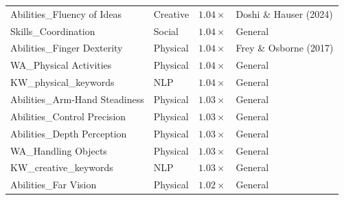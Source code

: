 \begin{table}[htbp]
\begin{tabular}{llcl}
Abilities\_Fluency of Ideas & Creative & $1.04\times$ & Doshi \& Hauser (2024) \\
Skills\_Coordination & Social & $1.04\times$ & General \\
Abilities\_Finger Dexterity & Physical & $1.04\times$ & Frey \& Osborne (2017) \\
WA\_Physical Activities & Physical & $1.04\times$ & General \\
KW\_physical\_keywords & NLP & $1.04\times$ & General \\
Abilities\_Arm-Hand Steadiness & Physical & $1.03\times$ & General \\
Abilities\_Control Precision & Physical & $1.03\times$ & General \\
Abilities\_Depth Perception & Physical & $1.03\times$ & General \\
WA\_Handling Objects & Physical & $1.03\times$ & General \\
KW\_creative\_keywords & NLP & $1.03\times$ & General \\
Abilities\_Far Vision & Physical & $1.02\times$ & General \\
\bottomrule
\end{tabular}
\end{table}
